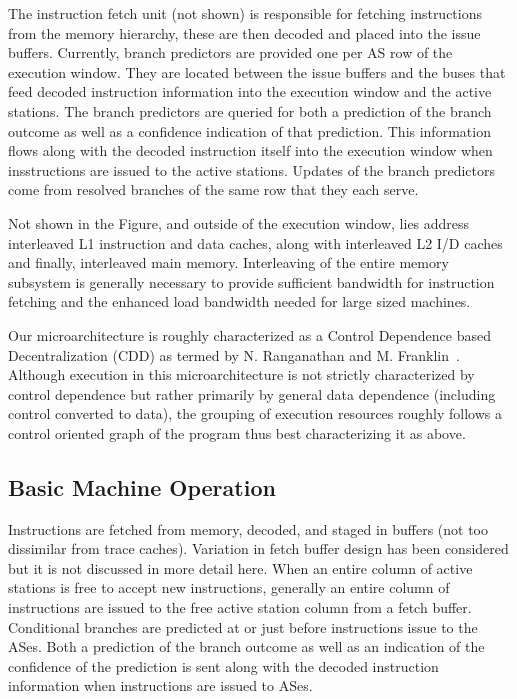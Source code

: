 \documentclass[10pt,dvips]{article}
\begin{document}
The instruction fetch unit (not shown) is responsible for
fetching instructions from the memory hierarchy, these are then decoded
and placed into the issue buffers.   
Currently, branch predictors are provided one per AS row of the execution
window.  
They are located between the issue buffers and the buses that feed
decoded instruction information into the execution window and the
active stations.  The branch predictors are queried for both
a prediction of the branch outcome as well as a confidence
indication of that prediction.  This information flows along with
the decoded instruction itself into the
execution window when insstructions are issued to the active stations.
Updates of the branch predictors come from resolved branches
of the same row that they each serve.

Not shown in the Figure, and outside of the execution window,
lies address interleaved L1 instruction and data caches, along with
interleaved L2 I/D caches and finally, interleaved main memory.
Interleaving of the entire memory subsystem is generally necessary
to provide sufficient bandwidth for instruction fetching and the
enhanced load bandwidth needed for large sized machines.

Our microarchitecture is roughly characterized as a Control Dependence
based Decentralization (CDD) as termed by N. Ranganathan and
M. Franklin~\cite{Ranganathan98}.
Although execution in this microarchitecture is not strictly
characterized by control dependence but rather primarily by
general data dependence (including control converted to data),
the grouping of execution resources roughly follows a control
oriented graph of the program thus best characterizing it as above.
%
\subsection{Basic Machine Operation}
%
Instructions are fetched from memory, decoded, and staged in buffers
(not too dissimilar from trace caches).  Variation in fetch buffer
design has been considered but it is not discussed in more detail here.
When an entire column
of active stations is free to accept new instructions, generally
an entire column of instructions are issued to the free active station
column from a fetch buffer.
Conditional branches are
predicted at or just before instructions issue to the ASes.
Both a prediction of the branch outcome as well as an indication
of the confidence of the prediction is sent along with the
decoded instruction information when instructions are issued to
ASes.
\end{document}
